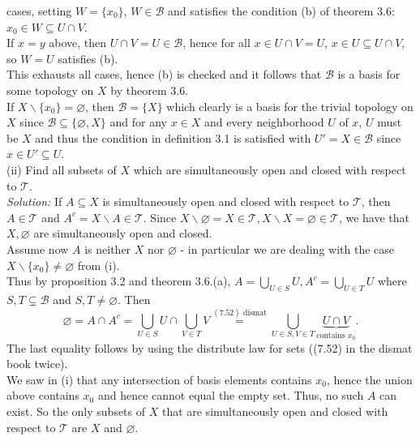 \documentclass[a4paper]{article}
\begin{document}
cases, setting $W = \{x_0\}$, $W \in \mathcal{B}$ and satisfies the condition
(b) of theorem 3.6: $x_0 \in W \subseteq U \cap V$.\\
If $x=y$ above, then $U\cap V = U \in \mathcal{B}$, hence for all
$x \in U\cap V = U$, $x \in U \subseteq U\cap V$, so $W=U$ satisfies (b).\\
This exhausts all cases, hence (b) is checked and it follows that
$\mathcal{B}$ is a basis for some topology on $X$ by theorem 3.6.\\
\linebreak
If $X \backslash \{x_0\} = \varnothing$, then $\mathcal{B}= \{X\}$ which
clearly is a basis for the trivial topology on $X$ since $\mathcal{B} \subseteq
\{\varnothing, X\}$ and for any $x \in X$ and every neighborhood $U$ of $x$,
$U$ must be $X$ and thus the condition in definition 3.1 is satisfied with $U'
= X \in \mathcal{B}$ since $x \in U' \subseteq U$.\\
\linebreak
(ii) Find all subsets of $X$ which are simultaneously open and closed with
respect to $\mathcal{T}$.\\
\linebreak
\textit{Solution:} If $A \subseteq X$ is simultaneously open and closed with
respect to $\mathcal{T}$, then $A \in \mathcal{T}$ and $A^{c} = X \backslash A \in
\mathcal{T}$. Since $X \backslash \varnothing = X \in \mathcal{T}, X \backslash
X = \varnothing \in \mathcal{T}$, we have that $X, \varnothing$ are
simultaneously open and closed.\\
\linebreak
Assume now $A$ is neither $X$ nor $\varnothing$ - in particular we are dealing
with the case $X \backslash \{x_0\} \neq \varnothing$ from (i).\\
Thus by proposition 3.2 and theorem 3.6.(a),
$A = \bigcup_{U \in S} U, A^{c} = \bigcup_{U \in T} U$ where
$S,T \subsetneq \mathcal{B}$ and $S,T \neq \varnothing$. Then
\[
\varnothing = A \cap A^{c} = \bigcup_{U \in S} U \cap \bigcup_{V \in T} V
\stackrel{(7.52) \text{ dismat}}{=} \bigcup_{U \in S, V \in T}  \underbrace{U \cap V}_{\text{contains }x_0}
.\] 
The last equality follows by using the distribute law for sets ((7.52) in the
dismat book twice).\\
We saw in (i) that any intersection of basis elements contains $x_0$, hence the
union above contains $x_0$ and hence cannot equal the empty set. Thus, no such
$A$ can exist. So the only subsets of $X$ that are simultaneously open and closed with
respect to $\mathcal{T}$ are $X$ and $\varnothing$.\\
\end{document}

